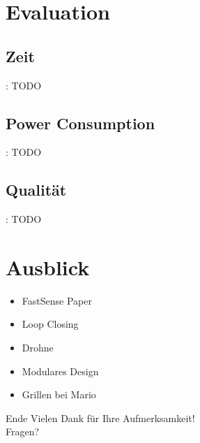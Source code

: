 \documentclass{beamer}
\begin{document}
\section{Evaluation}

\subsection{Zeit}
\begin{frame}{\secname: \subsecname}
TODO
\end{frame}

\subsection{Power Consumption}
\begin{frame}{\secname: \subsecname}
TODO
\end{frame}

\subsection{Qualität}
\begin{frame}{\secname: \subsecname}
TODO
\end{frame}

\section{Ausblick}
\begin{frame}{\secname}
\begin{itemize}
\item{FastSense Paper}
\item{Loop Closing}
\item{Drohne}
\item{Modulares Design}
\item{Grillen bei Mario}
\end{itemize}
\end{frame}

\begin{frame}{Ende}
\centering\LARGE
Vielen Dank für Ihre Aufmerksamkeit!\\\vspace{1cm}
Fragen?
\end{frame}
\end{document}
